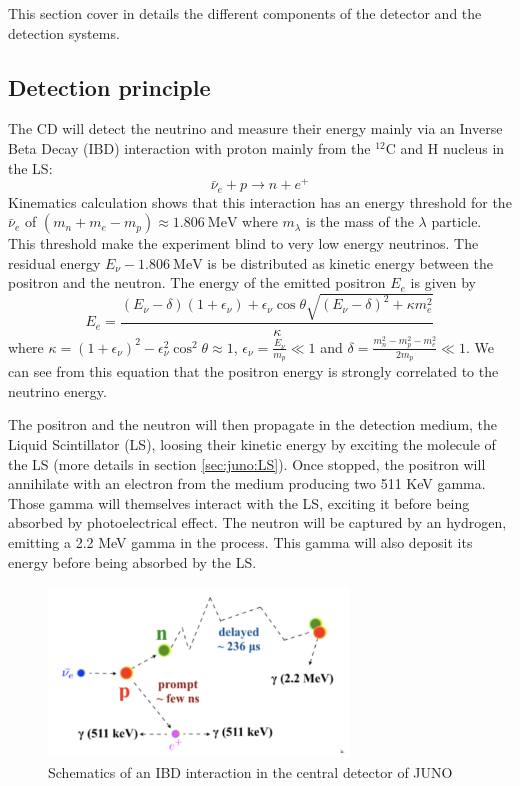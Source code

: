This section cover in details the different components of the detector and the detection systems.

\subsection{Detection principle}

The CD will detect the neutrino and measure their energy mainly via an Inverse Beta Decay (IBD) interaction with proton mainly from the $^{12}$C and H nucleus in the LS:
\begin{equation*}
  \bar{\nu}_e + p \rightarrow n + e^+
\end{equation*}
Kinematics calculation shows that this interaction has an energy threshold for the $\bar{\nu}_e$ of $ (m_n + m_e - m_p ) \approx 1.806 ~ \mathrm{MeV}$ \cite{strumia_precise_2003} where $m_\lambda$ is the mass of the $\lambda$ particle.
This threshold make the experiment blind to very low energy neutrinos. The residual energy $E_{\nu} - 1.806 ~ \mathrm{MeV}$ is be distributed as kinetic energy between the positron and the neutron.
The energy of the emitted positron $E_e$ is given by \cite{strumia_precise_2003}
\begin{equation}
  E_e = \frac{(E_\nu - \delta)(1+\epsilon_\nu) + \epsilon_\nu \cos \theta \sqrt{(E_\nu - \delta)^2 + \kappa m_e^2}}{\kappa}
\end{equation}
where $\kappa = (1 + \epsilon_\nu)^2 - \epsilon_\nu^2 \cos^2 \theta \approx 1$, $\epsilon_\nu = \frac{E_\nu}{m_p} \ll 1$ and $\delta = \frac{m_n^2 - m_p^2 - m_e^2}{2m_p} \ll 1$.
We can see from this equation that the positron energy is strongly correlated to the neutrino energy.


The positron and the neutron will then propagate in the detection medium, the Liquid Scintillator (LS), loosing their kinetic energy by exciting the molecule of the LS (more details in section \ref{sec:juno:LS}). Once stopped, the positron will annihilate with an electron from the medium producing two 511 KeV gamma. Those gamma will themselves interact with the LS, exciting it before being absorbed by photoelectrical effect. The neutron will be captured by an hydrogen, emitting a 2.2 MeV gamma in the process. This gamma will also deposit its energy before being absorbed by the LS.

\begin{figure}[ht]
  \centering
  \includegraphics[width=8cm]{images/juno/IDB-JUNO.png}
  \caption{Schematics of an IBD interaction in the central detector of JUNO}
  \label{fig:juno:IBD}
\end{figure}

